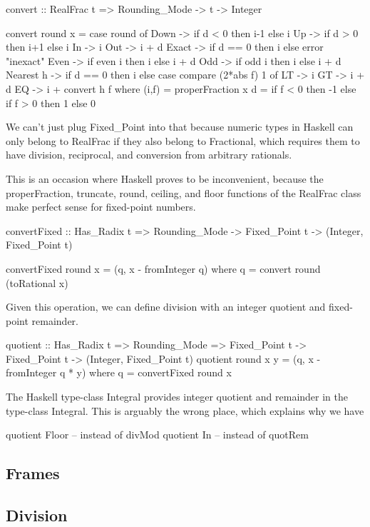\documentclass{article}
\begin{document}
\begin{code}
convert :: RealFrac t => Rounding_Mode -> t -> Integer

convert round x =
  case round of
    Down      -> if d < 0 then i-1 else i
    Up        -> if d > 0 then i+1 else i
    In        -> i
    Out       -> i + d
    Exact     -> if d == 0 then i else error "inexact"
    Even      -> if even i then i else i + d
    Odd       -> if odd  i then i else i + d
    Nearest h -> if d == 0 then i else
                 case compare (2*abs f) 1 of
                   LT -> i
                   GT -> i + d
                   EQ -> i + convert h f
  where (i,f) = properFraction x
        d     = if f < 0 then -1 else if f > 0 then 1 else 0
\end{code}

We can't just plug Fixed\_Point into that because numeric types
in Haskell can only belong to RealFrac if they also belong to
Fractional, which requires them to have division, reciprocal,
and conversion from arbitrary rationals.

This is an occasion where Haskell proves to be inconvenient,
because the properFraction, truncate, round, ceiling, and floor
functions of the RealFrac class make perfect sense for
fixed-point numbers.

\begin{code}
convertFixed :: Has_Radix t =>
    Rounding_Mode -> Fixed_Point t -> (Integer, Fixed_Point t)

convertFixed round x = (q, x - fromInteger q)
  where q = convert round (toRational x)
\end{code}

Given this operation, we can define division with an
integer quotient and fixed-point remainder.

\begin{code}
quotient :: Has_Radix t => 
    Rounding_Mode => Fixed_Point t -> Fixed_Point t ->
    (Integer, Fixed_Point t)
quotient round x y = (q, x - fromInteger q * y)
  where q = convertFixed round x
\end{code}

The Haskell type-class Integral provides integer quotient
and remainder in the type-class Integral.  This is arguably
the wrong place, which explains why we have
\begin{code}%
quotient Floor -- instead of divMod
quotient In    -- instead of quotRem
\end{code}

\subsection{Frames}

\subsection{Division}
\end{document}
